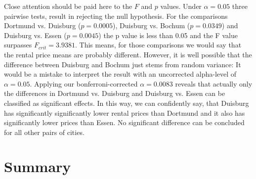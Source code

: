 \documentclass[12 pt]{scrartcl}
\begin{document}
Close attention should be paid here to the $F$ and $p$ values. Under $\alpha = 0.05$ three pairwise tests, result in rejecting the null hypothesis. For the comparisons Dortmund vs. Duisburg ($p = 0.0005$), Duisburg vs. Bochum ($p = 0.0349$) and Duisburg vs. Essen ($p = 0.0045$) the p value is less than 0.05 and the F value surpasses $F_{crit} = 3.9381$. This means, for those comparisons we would say that the rental price means are probably different. However, it is well possible that the difference between Duisburg and Bochum just stems from random variance: It would be a mistake to interpret the result with an uncorrected alpha-level of $\alpha = 0.05$. Applying our bonferroni-corrected $\alpha = 0.0083$ reveals that actually only the differences in Dortmund vs. Duisburg and Duisburg vs. Essen can be classified as significant effects. In this way, we can confidently say, that Duisburg has significantly significantly lower rental prices than Dortmund and it also has significantly lower prices than Essen. No significant difference can be concluded for all other pairs of cities.

\section{Summary}
\end{document}
